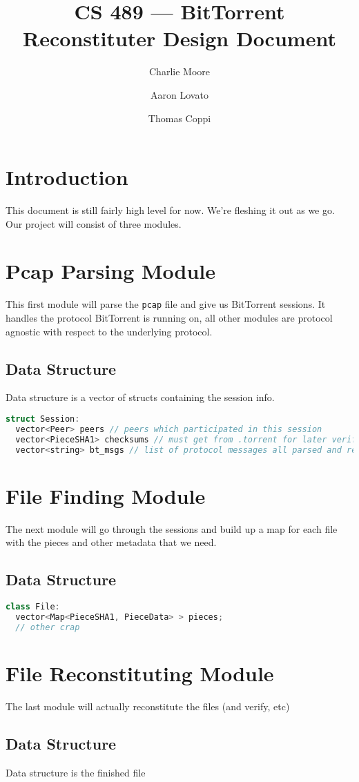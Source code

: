 \documentclass[11pt,titlepage]{article}
\author{Charlie Moore \and Aaron Lovato \and Thomas Coppi}
\title{CS 489 --- BitTorrent Reconstituter Design Document}
\begin{document}
\maketitle

\section{Introduction}
This document is still fairly high level for now.  We're fleshing it out as we
go.  Our project will consist of three modules.

\section{Pcap Parsing Module}
This first module will parse the \verb=pcap= file and give us BitTorrent
sessions.  It handles the protocol BitTorrent is running on, all other modules
are protocol agnostic with respect to the underlying protocol.

\subsection{Data Structure}
Data structure is a vector of structs containing the session info.
\begin{lstlisting}[language=C++]
struct Session:
  vector<Peer> peers // peers which participated in this session
  vector<PieceSHA1> checksums // must get from .torrent for later verification
  vector<string> bt_msgs // list of protocol messages all parsed and ready
\end{lstlisting}

\section{File Finding Module}
The next module will go through the sessions and build up a map for each file with
the pieces and other metadata that we need.

\subsection{Data Structure}
\begin{lstlisting}[language=C++]
class File:
  vector<Map<PieceSHA1, PieceData> > pieces;
  // other crap
\end{lstlisting}

\section{File Reconstituting Module}
The last module will actually reconstitute the files (and verify, etc)

\subsection{Data Structure}
Data structure is the finished file
\end{document}

